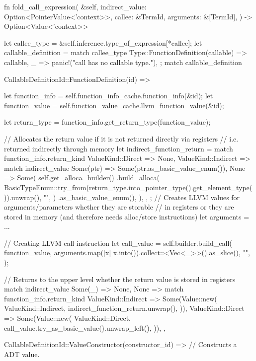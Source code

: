 \documentclass[
  oneside,
  english,
  coorientadorbanca,
  noabntexcite
]{ufsc-thesis-rn46-2019}
\begin{document}
\begin{rustcode}
fn fold_call_expression(
  &self,
  indirect_value: Option<PointerValue<'context>>,
  callee: &TermId,
  arguments: &[TermId],
) -> Option<Value<'context>> {
  let callee_type = &self.inference.type_of_expression[*callee];
  let callable_definition = match callee_type {
    Type::FunctionDefinition(callable) => callable,
    _ => panic!("call has no callable type."),
  };
  match callable_definition {
    CallableDefinitionId::FunctionDefinition(id) => {
      let function_info = self.function_info_cache.function_info(&id);
      let function_value = self.function_value_cache.llvm_function_value(&id);

      let return_type = function_info.get_return_type(function_value);

      // Allocates the return value if it is not returned directly via registers
      // i.e. returned indirectly through memory
      let indirect_function_return = match function_info.return_kind {
        ValueKind::Direct => None,
        ValueKind::Indirect => match indirect_value {
          Some(ptr) => Some(ptr.as_basic_value_enum()),
          None => Some(
            self.get_alloca_builder()
              .build_alloca(
                BasicTypeEnum::try_from(return_type.into_pointer_type().get_element_type()).unwrap(),
                "",
              )
              .as_basic_value_enum(),
          ),
        },
      }; 
      // Creates LLVM values for arguments/parameters whether they are storable
      // in registers or they are stored in memory (and therefore needs alloc/store instructions)
      let arguments = ...

      // Creating LLVM call instruction
      let call_value = self.builder.build_call(
          function_value,
          arguments.map(|x| x.into()).collect::<Vec<_>>().as_slice(),
          "",
      );

      // Returns to the upper level whether the return value is stored in registers
      match indirect_value {
          Some(_) => None,
          None => match function_info.return_kind {
              ValueKind::Indirect => Some(Value::new(
                  ValueKind::Indirect,
                  indirect_function_return.unwrap(),
              )),
              ValueKind::Direct => Some(Value::new(
                  ValueKind::Direct,
                  call_value.try_as_basic_value().unwrap_left(),
              )),
          },
      }
    }
    CallableDefinitionId::ValueConstructor(constructor_id) => {
      // Constructs a ADT value.
    }
  }
}
\end{rustcode}
\end{document}
